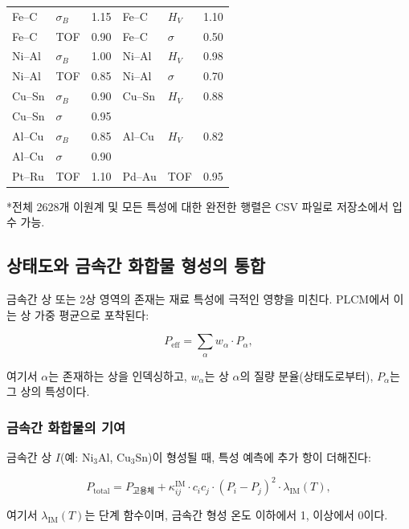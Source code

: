 \documentclass[12pt,a4paper]{article}
\begin{document}
\begin{longtable}{p{1.5cm}p{1.5cm}p{1.2cm}p{1.2cm}p{1.2cm}p{1.2cm}}
		Fe–C  & \(\sigma_B\) & 1.15 & Fe–C  & \(H_V\) & 1.10 \\
		Fe–C  & TOF & 0.90 & Fe–C  & \(\sigma\) & 0.50 \\
		Ni–Al & \(\sigma_B\) & 1.00 & Ni–Al & \(H_V\) & 0.98 \\
		Ni–Al & TOF & 0.85 & Ni–Al & \(\sigma\) & 0.70 \\
		Cu–Sn & \(\sigma_B\) & 0.90 & Cu–Sn & \(H_V\) & 0.88 \\
		Cu–Sn & \(\sigma\) & 0.95 & & & \\
		Al–Cu & \(\sigma_B\) & 0.85 & Al–Cu & \(H_V\) & 0.82 \\
		Al–Cu & \(\sigma\) & 0.90 & & & \\
		Pt–Ru & TOF & 1.10 & Pd–Au & TOF & 0.95 \\
		\bottomrule
	\end{longtable}
	*전체 2628개 이원계 및 모든 특성에 대한 완전한 행렬은 CSV 파일로 저장소에서 입수 가능.
	
	\subsection{상태도와 금속간 화합물 형성의 통합}
	\label{subsec:phase-diagrams}
	
	금속간 상 또는 2상 영역의 존재는 재료 특성에 극적인 영향을 미친다. PLCM에서 이는 상 가중 평균으로 포착된다:
	
	\begin{equation}
		P_{\text{eff}} = \sum_{\alpha} w_{\alpha} \cdot P_{\alpha},
		\label{eq:phase-weighted}
	\end{equation}
	
	여기서 \(\alpha\)는 존재하는 상을 인덱싱하고, \(w_{\alpha}\)는 상 \(\alpha\)의 질량 분율(상태도로부터), \(P_{\alpha}\)는 그 상의 특성이다.
	
	\subsubsection{금속간 화합물의 기여}
	금속간 상 \(I\)(예: Ni\(_3\)Al, Cu\(_3\)Sn)이 형성될 때, 특성 예측에 추가 항이 더해진다:
	
	\begin{equation}
		P_{\text{total}} = P_{\text{고용체}} + \kappa_{ij}^{\text{IM}} \cdot c_i c_j \cdot (P_i - P_j)^2 \cdot \lambda_{\text{IM}}(T),
		\label{eq:intermetallic-term}
	\end{equation}
	
	여기서 \(\lambda_{\text{IM}}(T)\)는 단계 함수이며, 금속간 형성 온도 이하에서 1, 이상에서 0이다.
	
\end{document}
